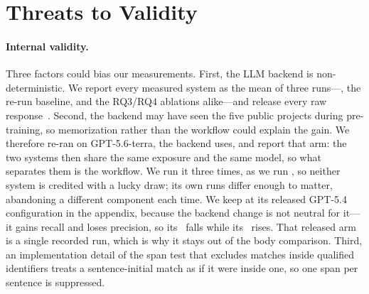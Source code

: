 
\section{Threats to Validity}
\label{sec:threats}

\paragraph{Internal validity.}
Three factors could bias our measurements.
First, the \ac{LLM} backend is non-deterministic.
We report every measured system as the mean of three runs---\approach{}, the re-run \Artemis{} baseline, and the RQ3/RQ4 ablations alike---and release every raw response~\cite{replication}.
Second, the backend may have seen the five public projects during pre-training, so memorization rather than the workflow could explain the gain.
We therefore re-ran \Artemis{} on GPT-5.6-terra, the backend \approach{} uses, and report that arm: the two systems then share the same exposure and the same model, so what separates them is the workflow.
We run it three times, as we run \approach{}, so neither system is credited with a lucky draw; its own runs differ enough to matter, abandoning a different component each time.
We keep \Artemis{} at its released GPT-5.4 configuration in the appendix, because the backend change is not neutral for it---it gains recall and loses precision, so its \fone\ falls while its \ftwo\ rises.
That released arm is a single recorded run, which is why it stays out of the body comparison.
Third, an implementation detail of the span test that excludes matches inside qualified identifiers treats a sentence-initial match as if it were inside one, so one span per sentence is suppressed.
